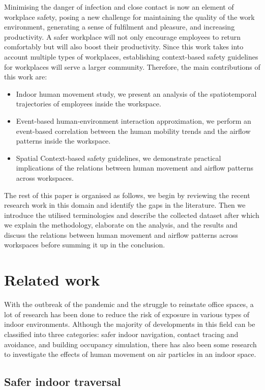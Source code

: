 \documentclass[acmtog]{acmart}
\begin{document}
Minimising the danger of infection and close contact is now an element of workplace safety, posing a new challenge for maintaining the quality of the work environment, generating a sense of fulfilment and pleasure, and increasing productivity. A safer workplace will not only encourage employees to return comfortably but will also boost their productivity. Since this work takes into account multiple types of workplaces, establishing context-based safety guidelines for workplaces will serve a larger community. Therefore, the main contributions of this work are:
\begin{itemize}
    \item Indoor human movement study, we present an analysis of the spatiotemporal trajectories of employees inside the workspace.
    \item Event-based human-environment interaction approximation, we perform an event-based correlation between the human mobility trends and the airflow patterns inside the workspace.
    \item Spatial Context-based safety guidelines, we demonstrate practical implications of the relations between human movement and airflow patterns across workspaces.
\end{itemize}
The rest of this paper is organised as follows, we begin by reviewing the recent research work in this domain and identify the gaps in the literature. Then we introduce the utilised terminologies and describe the collected dataset after which we explain the methodology, elaborate on the analysis, and the results and discuss the relations between human movement and airflow patterns across workspaces before summing it up in the conclusion.

\section{Related work}
With the outbreak of the pandemic and the struggle to reinstate office spaces, a lot of research has been done to reduce the risk of exposure in various types of indoor environments. Although the majority of developments in this field can be classified into three categories: safer indoor navigation, contact tracing and avoidance, and building occupancy simulation, there has also been some research to investigate the effects of human movement on air particles in an indoor space.

\subsection{Safer indoor traversal}
\end{document}
